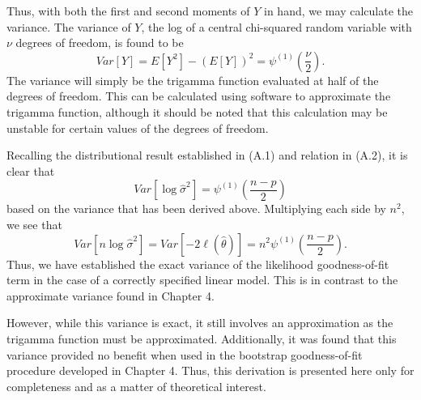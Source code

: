 Thus, with both the first and second moments of $Y$ in hand, we may calculate the variance. The variance of $Y$, the log of a central chi-squared random variable with
$\nu$ degrees of freedom, is found to be
\begin{equation*}
	Var \left[ Y \right ] = E \left[ Y^2 \right] - \left( E \left[ Y \right] \right)^2 = \psi^{(1)} \left( \frac{\nu}{2} \right) .
\end{equation*}
The variance will simply be the trigamma function evaluated at half of the degrees of freedom. This can be calculated using software to approximate the trigamma function,
although it should be noted that this calculation may be unstable for certain values of the degrees of freedom.

Recalling the distributional result established in (A.1) and relation in (A.2), it is clear that
\begin{equation*}
	Var \left[ \log \hat{\sigma}^2 \right] = \psi^{(1)} \left( \frac{n-p}{2} \right)
\end{equation*}
based on the variance that has been derived above. Multiplying each side by $n^2$, we see that
\begin{equation*}
	Var \left[ n \log \hat{\sigma}^2 \right] = Var \left[ -2 \ell (\hat{\theta} ) \right] = n^2 \psi^{(1)} \left( \frac{n-p}{2} \right).
\end{equation*}
Thus, we have established the exact variance of the likelihood goodness-of-fit term in the case of a correctly specified linear model. This is in contrast to the
approximate variance found in Chapter 4.

However, while this variance is exact, it still involves an approximation as the trigamma function must be approximated. Additionally, it was found that
this variance provided no benefit when used in the bootstrap goodness-of-fit procedure developed in Chapter 4. Thus, this derivation is presented here only
for completeness and as a matter of theoretical interest.










